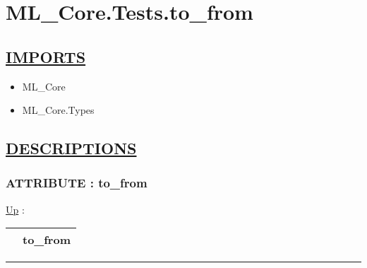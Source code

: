 \chapter*{ML\_Core.Tests.to\_from}
\hypertarget{ecldoc:toc:ML_Core.Tests.to_from}{}

\section*{\underline{IMPORTS}}
\begin{itemize}
\item ML\_Core
\item ML\_Core.Types
\end{itemize}

\section*{\underline{DESCRIPTIONS}}
\subsection*{ATTRIBUTE : to\_from}
\hypertarget{ecldoc:ml_core.tests.to_from}{}
\hyperlink{ecldoc:toc:ML_Core/Tests}{Up} :

{\renewcommand{\arraystretch}{1.5}
\begin{tabularx}{\textwidth}{|>{\raggedright\arraybackslash}l|X|}
\hline
\hspace{0pt} & to\_from \\
\hline
\end{tabularx}
}

\par


\rule{\linewidth}{0.5pt}
